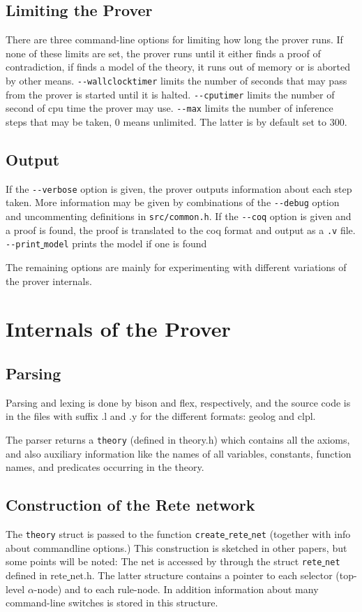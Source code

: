 \documentclass[a4paper]{article}
\begin{document}
\subsection{Limiting the Prover}
There are three command-line options for limiting how long the prover runs. If none of these limits are set, the prover runs until it either finds a proof of contradiction, if finds a model of the theory, it runs out of memory or is aborted by other means. \verb|--wallclocktimer| limits the number of seconds that may pass from the prover is started until it is halted. \verb|--cputimer| limits the number of second of cpu time the prover may use. \verb|--max| limits the number of inference steps that may be taken, $0$ means unlimited. The latter is by default set to $300$.

\subsection{Output}
If the \verb|--verbose| option is given, the prover outputs information about each step taken. More information may be given by combinations of the \verb|--debug| option and uncommenting definitions in \verb|src/common.h|. 
If the \verb|--coq| option is given and a proof is found, the proof is translated to the coq format and output as a \verb|.v| file. \verb|--print|\underline{ }\verb|model| prints the model if one is found


The remaining options are mainly for experimenting with different variations of the prover internals. 

\section{Internals of the Prover}

\subsection{Parsing}
Parsing and lexing is done by bison and flex, respectively, and the source code is in the files with suffix .l and .y for the different formats: geolog and clpl. 

The parser returns a \verb|theory| (defined in theory.h) which contains all the axioms, and also auxiliary information like the names of all variables, constants, function names, and predicates occurring in the theory. 

\subsection{Construction of the Rete network}
The \verb|theory| struct is passed to the function \verb|create|\underline{ }\verb|rete|\underline{ }\verb|net| (together with info about commandline options.) This construction is sketched in other papers, but some points will be noted: The net is accessed by through the struct \verb|rete|\underline{ }\verb|net| defined in rete\underline{ }net.h. The latter structure contains a pointer to each selector (top-level $\alpha$-node) and to each rule-node. In addition information about many command-line switches is stored in this structure. 
\end{document}
